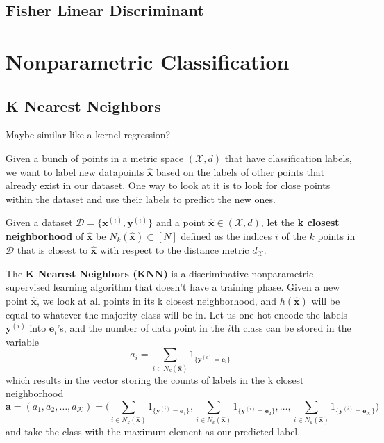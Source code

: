 \documentclass{article}
\begin{document}
  \subsection{Fisher Linear Discriminant} 

\section{Nonparametric Classification}

  \subsection{K Nearest Neighbors} 

    \begin{question}[To Do]
      Maybe similar like a kernel regression?  
    \end{question}

    Given a bunch of points in a metric space $(\mathcal{X}, d)$ that have classification labels, we want to label new datapoints $\hat{\mathbf{x}}$ based on the labels of other points that already exist in our dataset. One way to look at it is to look for close points within the dataset and use their labels to predict the new ones. 

    \begin{definition}
      Given a dataset $\mathcal{D} = \{\mathbf{x}^{(i)}, \mathbf{y}^{(i)}\}$ and a point $\hat{\mathbf{x}} \in (\mathcal{X}, d)$, let the \textbf{k closest neighborhood} of $\hat{\mathbf{x}}$ be $N_k (\hat{\mathbf{x}}) \subset [N]$ defined as the indices $i$ of the $k$ points in $\mathcal{D}$ that is closest to $\hat{\mathbf{x}}$ with respect to the distance metric $d_\mathcal{X}$. 
    \end{definition}

    \begin{definition}
      The \textbf{K Nearest Neighbors (KNN)} is a discriminative nonparametric supervised learning algorithm that doesn't have a training phase. Given a new point $\hat{\mathbf{x}}$, we look at all points in its k closest neighborhood, and $h(\hat{\mathbf{x}})$ will be equal to whatever the majority class will be in. Let us one-hot encode the labels $\mathbf{y}^{(i)}$ into $\mathbf{e}_i$'s, and the number of data point in the $i$th class can be stored in the variable 
      \begin{equation}
        a_i = \sum_{i \in N_k (\hat{\mathbf{x}})} 1_{\{\mathbf{y}^{(i)} = \mathbf{e}_i\}}
      \end{equation}
      which results in the vector storing the counts of labels in the k closest neighborhood 
      \begin{equation}
        \mathbf{a} = (a_1, a_2, \ldots, a_\mathcal{K}) = \bigg( \sum_{i \in N_k (\hat{\mathbf{x}})} 1_{\{\mathbf{y}^{(i)} = \mathbf{e}_1\}}, \sum_{i \in N_k (\hat{\mathbf{x}})} 1_{\{\mathbf{y}^{(i)} = \mathbf{e}_2\}}, \ldots, \sum_{i \in N_k (\hat{\mathbf{x}})} 1_{\{\mathbf{y}^{(i)} = \mathbf{e}_\mathcal{K}\}} \bigg) 
      \end{equation}
      and take the class with the maximum element as our predicted label. 
    \end{definition}
\end{document}
